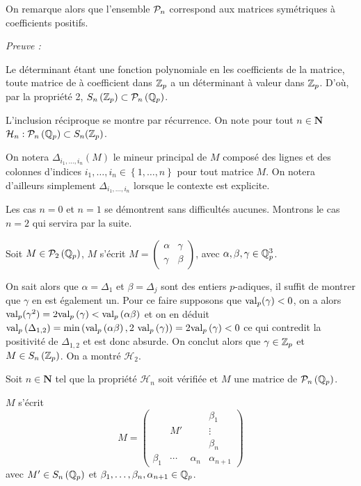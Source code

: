 \begin{remarque}
	On remarque alors que l'ensemble $\P_n$ correspond aux matrices symétriques à coefficients positifs.   
\end{remarque}
	\textit{Preuve :}

 Le déterminant étant une fonction polynomiale en les coefficients de la matrice, toute matrice de à coefficient dans $\Zp$ a un déterminant à valeur dans $\Zp$. D'où, par la propriété 2, $S_n\left( \Zp \right) \subset \Pn $.

 L'inclusion réciproque se montre par récurrence. On note pour tout $n \in \mathbf{N}$ $\mathcal{H}_n :  \Pn \subset  S_n(\Zp )$.

 
 On notera $ \Delta_{i_1,\ldots,i_n}\left( M \right) $ le mineur principal de $M$ composé des lignes et des colonnes d'indices $i_1,\ldots,i_n \in \left\{ 1,\ldots,n \right\} $ pour tout matrice $M$. On notera d'ailleurs simplement  $ \Delta_{i_1,\ldots,i_n}$ lorsque le contexte est explicite.

 Les cas $n=0$ et $n=1$ se démontrent sans difficultés aucunes. Montrons le cas $n=2$ qui servira par la suite.

 Soit $M \in \P_2\left( \Qp \right) $, $M$ s'écrit $M = \begin{pmatrix} \alpha & \gamma \\ \gamma & \beta \end{pmatrix}$, avec $\alpha, \beta, \gamma \in \Qp^3$.



 On sait alors que $ \alpha = \Delta_1$ et $ \beta = \Delta_j$ sont des entiers $p$-adiques, il suffit de montrer que $\gamma$ en est également un. Pour ce faire supposons que $ \val (\gamma) < 0$, on a alors $\val ( \gamma^2) = 2 \val\left( \gamma \right) < \val\left( \alpha \beta \right) $ et on en déduit $ \val \left( \Delta_{1,2} \right)= \min\left( \val\left( \alpha \beta \right),2~ \val \left( \gamma \right) \right) = 2 \val\left( \gamma \right) <0 $ ce qui contredit la positivité de $\Delta_{1,2}$ et est donc absurde. On conclut alors que $ \gamma \in \Zp$ et $M \in  S_n\left( \Zp \right) $. On a montré $\mathcal{H}_2$. 

 Soit $n \in \mathbf{N}$ tel que la propriété $\mathcal{H}_n $ soit vérifiée et $M$ une matrice de $\Pn$. 

 $M$ s'écrit 
 \[
 M= \left(\begin{array}{ccc|c}
  &      &     &   \beta_1  \\
  &  M'  &     &\vdots\\
  &      &     &   \beta_n  \\
\hline
\beta_1 &\cdots&  \alpha_n  & \alpha_{n+1}
\end{array} \right)
\]
avec $M' \in S_n\left( \Qp \right) $ et $\beta_1,\ldots, \beta_n, \alpha_{n+1} \in \Qp$.

